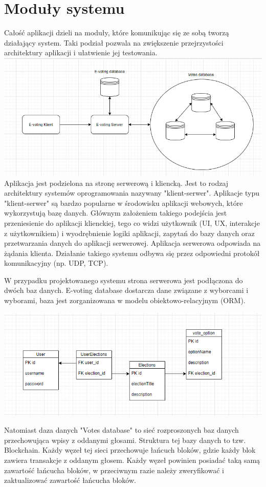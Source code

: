 \documentclass{report}
\begin{document}
\section{Moduły systemu}
Całość aplikacji dzieli na moduły, które komunikując się ze sobą tworzą działający system. Taki podział pozwala na zwiększenie przejrzystości architektury aplikacji i ułatwienie jej testowania.
\includegraphics[width=\textwidth]{images/podział_na_moduły.png}
Aplikacja jest podzielona na stronę serwerową i kliencką. Jest to rodzaj architektury systemów oprogramowania nazywany "klient-serwer". Aplikacje typu "klient-serwer" są bardzo popularne w środowisku aplikacji webowych, które wykorzystują bazę danych. Głównym założeniem takiego podejścia jest przeniesienie do aplikacji klienckiej, tego co widzi użytkownik (UI, UX, interakcje z użytkownikiem) i wyodrębnienie logiki aplikacji, zapytań do bazy danych oraz przetwarzania danych do aplikacji serwerowej. Aplikacja serwerowa odpowiada na żądania klienta. Działanie takiego systemu odbywa się przez odpowiedni protokół komunikacyjny (np. UDP, TCP).



W przypadku projektowanego systemu strona serwerowa jest podłączona do dwóch baz danych. E-voting database dostarcza dane związane z wyborcami i wyborami, baza jest zorganizowana w modelu obiektowo-relacyjnym (ORM).

\includegraphics[width=\textwidth]{images/Baza_danych.png}

Natomiast daza danych "Votes database" to sieć rozproszonych baz danych przechowująca wpisy z oddanymi głosami. Struktura tej bazy danych to tzw. Blockchain. Każdy węzeł tej sieci przechowuje łańcuch bloków, gdzie każdy blok zawiera transakcje z oddanym głosem. Każdy węzeł powinien posiadać taką samą zawartość łańcucha bloków, w przeciwnym razie należy zweryfikować i zaktualizować zawartość łańcucha bloków.
\end{document}
